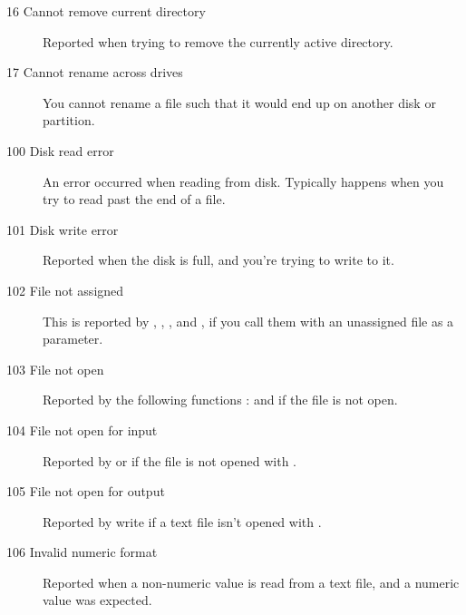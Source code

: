 \begin{description}
\item [16  Cannot remove current directory]
Reported when trying to remove the currently active directory.

\item [17  Cannot rename across drives]
You cannot rename a file such that it would end up on another disk or
partition.

\item [100  Disk read error]
An error occurred when reading from disk. Typically happens when you try
to read past the end of a file.

\item [101  Disk write error]
Reported when the disk is full, and you're trying to write to it.

\item [102  File not assigned]
This is reported by , , , 
 and , if you call
them with an unassigned file as a parameter.

\item [103  File not open]
Reported by the following functions :  and  if the 
file is not open.

\item [104  File not open for input]
Reported by  or  if 
the file is not opened with .

\item [105  File not open for output]
Reported by write if a text file isn't opened with .

\item [106  Invalid numeric format]
Reported when a non-numeric value is read from a text file, and a numeric
value was expected.


\end{description}
